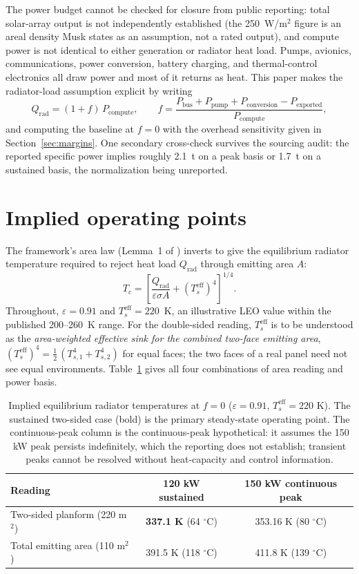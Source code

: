 \documentclass[11pt]{article}
\newcommand{\Tc}{T_c}
\newcommand{\Ts}{T_s^{\mathrm{eff}}}
\newcommand{\eps}{\varepsilon}
\begin{document}
The power budget cannot be checked for closure from public reporting: total solar-array output is not independently established (the 250~W/m$^{2}$ figure is an areal density Musk states as an assumption, not a rated output), and compute power is not identical to either generation or radiator heat load. Pumps, avionics, communications, power conversion, battery charging, and thermal-control electronics all draw power and most of it returns as heat. This paper makes the radiator-load assumption explicit by writing
\begin{equation}
Q_{\mathrm{rad}} = (1+f)\,P_{\mathrm{compute}},
\qquad
f = \frac{P_{\mathrm{bus}}+P_{\mathrm{pump}}+P_{\mathrm{conversion}}-P_{\mathrm{exported}}}{P_{\mathrm{compute}}},
\label{eq:overhead}
\end{equation}
and computing the baseline at $f=0$ with the overhead sensitivity given in Section~\ref{sec:margins}. One secondary cross-check survives the sourcing audit: the reported specific power implies roughly 2.1~t on a peak basis or 1.7~t on a sustained basis, the normalization being unreported.

\section{Implied operating points}\label{sec:implied}

The framework's area law (Lemma~1 of \cite{leeodinson2026}) inverts to give the equilibrium radiator temperature required to reject heat load $Q_{\mathrm{rad}}$ through emitting area $A$:
\begin{equation}
\Tc = \left[\frac{Q_{\mathrm{rad}}}{\eps\sigma A} + (\Ts)^{4}\right]^{1/4}.
\end{equation}
Throughout, $\eps = 0.91$ and $\Ts = 220$~K, an illustrative LEO value within the published 200--260~K range. For the double-sided reading, $\Ts$ is to be understood as the \emph{area-weighted effective sink for the combined two-face emitting area}, $(\Ts)^{4} = \tfrac{1}{2}\,(T_{s,1}^{4}+T_{s,2}^{4})$ for equal faces; the two faces of a real panel need not see equal environments. Table~\ref{tab:operating} gives all four combinations of area reading and power basis.

\begin{table}[ht]
\centering
\begin{tabular}{lcc}
\toprule
Reading & 120 kW sustained & 150 kW continuous peak \\
\midrule
Two-sided planform (220 m$^{2}$) & \textbf{337.1 K} (64 $^{\circ}$C) & 353.16 K (80 $^{\circ}$C) \\
Total emitting area (110 m$^{2}$) & 391.5 K (118 $^{\circ}$C) & 411.8 K (139 $^{\circ}$C) \\
\bottomrule
\end{tabular}
\caption{Implied equilibrium radiator temperatures at $f=0$ ($\eps=0.91$, $\Ts=220$ K). The sustained two-sided case (bold) is the primary steady-state operating point. The continuous-peak column is the continuous-peak hypothetical: it assumes the 150 kW peak persists indefinitely, which the reporting does not establish; transient peaks cannot be resolved without heat-capacity and control information.}
\label{tab:operating}
\end{table}
\end{document}
